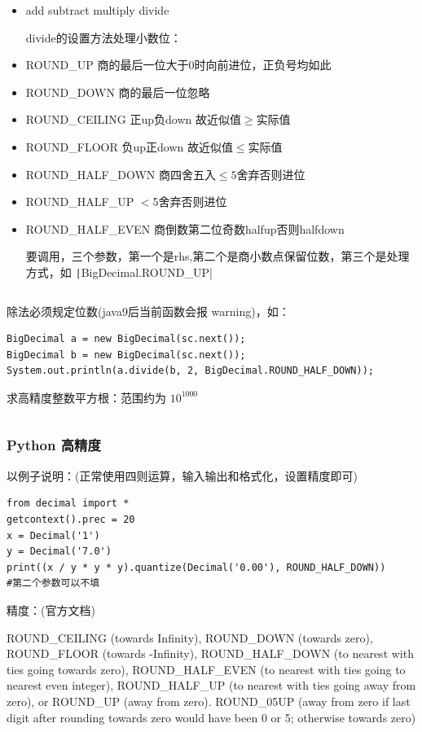 \documentclass[twocolumn,10pt]{ctexart}
\begin{document}
\begin{itemize}
\item add subtract multiply divide

divide的设置方法处理小数位：
\end{itemize}

\begin{itemize}
\item ROUND\_UP 商的最后一位大于0时向前进位，正负号均如此
\item ROUND\_DOWN 商的最后一位忽略
\item ROUND\_CEILING 正up负down 故近似值$\ge$实际值
\item ROUND\_FLOOR 负up正down 故近似值$\le$实际值
\item ROUND\_HALF\_DOWN 商四舍五入$\le5$舍弃否则进位
\item ROUND\_HALF\_UP $<$5舍弃否则进位
\item ROUND\_HALF\_EVEN 商倒数第二位奇数halfup否则halfdown

要调用，三个参数，第一个是rhs,第二个是商小数点保留位数，第三个是处理方式，如 \texttt|BigDecimal.ROUND_UP|
\end{itemize}

\inputminted{java}{code/ext_076.java}

除法必须规定位数(java9后当前函数会报 warning)，如：

\begin{verbatim}
BigDecimal a = new BigDecimal(sc.next());
BigDecimal b = new BigDecimal(sc.next());
System.out.println(a.divide(b, 2, BigDecimal.ROUND_HALF_DOWN));
\end{verbatim}

求高精度整数平方根：范围约为 $10^{1000}$

\inputminted{cpp}{code/ext_077.cpp}

\subsubsection{Python 高精度}

以例子说明：(正常使用四则运算，输入输出和格式化，设置精度即可)

\begin{verbatim}
from decimal import *
getcontext().prec = 20
x = Decimal('1')
y = Decimal('7.0')
print((x / y * y * y).quantize(Decimal('0.00'), ROUND_HALF_DOWN))
#第二个参数可以不填
\end{verbatim}

\begin{notebox}
精度：(官方文档)

ROUND\_CEILING (towards Infinity), ROUND\_DOWN (towards zero), ROUND\_FLOOR (towards -Infinity), ROUND\_HALF\_DOWN (to nearest with ties going towards zero), ROUND\_HALF\_EVEN (to nearest with ties going to nearest even integer), ROUND\_HALF\_UP (to nearest with ties going away from zero), or ROUND\_UP (away from zero). ROUND\_05UP (away from zero if last digit after rounding towards zero would have been 0 or 5; otherwise towards zero)
\end{notebox}
\end{document}
